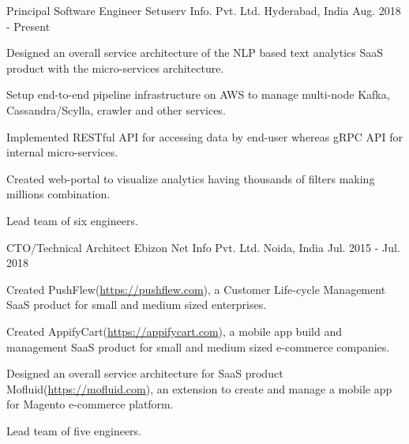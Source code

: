 

\begin{cventries}

  \cventry
    {Principal Software Engineer} %
    {Setuserv Info. Pvt. Ltd.} %
    {Hyderabad, India} %
    {Aug. 2018 - Present} %
    {
      \begin{cvitems} %
        \item {Designed an overall service architecture of the NLP based text analytics SaaS product with the micro-services architecture.}
        \item {Setup end-to-end pipeline infrastructure on AWS to manage multi-node Kafka, Cassandra/Scylla, crawler and other services.}
        \item {Implemented RESTful API for accessing data by end-user whereas gRPC API for internal micro-services.} 
        \item {Created web-portal to visualize analytics having thousands of filters making millions combination.}
        \item {Lead team of six engineers.}
      \end{cvitems}
    }

  \cventry
    {CTO/Technical Architect} %
    {Ebizon Net Info Pvt. Ltd.} %
    {Noida, India} %
    {Jul. 2015 - Jul. 2018} %
    {
      \begin{cvitems} %
        \item {Created PushFlew(\href{https://pushflew.com}{https://pushflew.com}), a Customer Life-cycle Management SaaS product for small and medium sized enterprises.}
        \item {Created AppifyCart(\href{https://appifycart.com}{https://appifycart.com}), a mobile app build and management SaaS product for small and medium sized e-commerce companies.}
        \item {Designed an overall service architecture for SaaS product Mofluid(\href{https://mofluid.com}{https://mofluid.com}), an extension to create and manage a 
        mobile app for Magento e-commerce platform.}
        \item {Lead team of five engineers.}
      \end{cvitems}
    }


\end{cventries}
